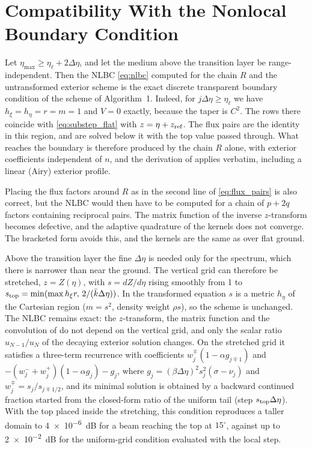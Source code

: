 \documentclass[journal]{IEEEtran}
\newcommand{\het}{\nu}
\newcommand{\etal}{\eta_{\ell}}
\begin{document}
\section{Compatibility With the Nonlocal Boundary Condition}\label{sec:nlbc}

Let $\eta_{\max}\ge\etal+2\Delta\eta$, and let the medium above the transition
layer be range-independent. Then the NLBC \eqref{eq:nlbc} computed for the
chain $R$ and the untransformed exterior scheme is the exact discrete
transparent boundary condition of the scheme of Algorithm~1. Indeed,
for $j\Delta\eta\ge\etal$ we have $h_\xi=h_\eta=r=m=1$ and $V=0$
exactly, because the taper is $C^2$. The rows there coincide with
\eqref{eq:substep_flat} with $z=\eta+z_{\rm ref}$. The flux pairs are the
identity in this region, and are solved below it with the top value passed
through. What reaches the boundary is therefore produced by the chain $R$
alone, with exterior coefficients independent of $n$, and the derivation of
\cite{lytaev2018awpl} applies verbatim, including a linear (Airy) exterior
profile.

Placing the flux factors around $R$ as in the second line of
\eqref{eq:flux_pairs} is also correct, but the NLBC would then have to be
computed for a chain of $p+2q$ factors containing reciprocal pairs. The matrix
function of the inverse $z$-transform becomes defective, and the adaptive
quadrature of the kernels does not converge. The bracketed form avoids this,
and the kernels are the same as over flat ground.

Above the transition layer the fine $\Delta\eta$ is needed only for the
spectrum, which there is narrower than near the ground. The vertical grid can
therefore be stretched, $z=Z(\eta)$, with $s=dZ/d\eta$ rising smoothly from 1
to $s_{\rm top}=\min(\max h_\xi r,\,2/(\bar k\Delta\eta))$. In the
transformed equation $s$ is a metric $h_\eta$ of the Cartesian region
($m=s^2$, density weight $\rho s$), so the scheme is unchanged. The NLBC
remains exact: the $z$-transform, the matrix function and the convolution of
\cite{lytaev2018awpl} do not depend on the vertical grid, and only the scalar
ratio $u_{N-1}/u_N$ of the decaying exterior solution changes. On the stretched
grid it satisfies a three-term recurrence with coefficients
$w^\mp_j(1-\alpha g_{j\mp1})$ and $-(w^-_j+w^+_j)(1-\alpha g_j)-g_j$, where
$g_j=(\beta\Delta\eta)^2s_j^2(\sigma-\het_j)$ and
$w^\mp_j=s_j/s_{j\mp1/2}$, and its minimal solution is obtained by a backward
continued fraction started from the closed-form ratio of the uniform tail
(step $s_{\rm top}\Delta\eta$). With the top placed inside the stretching,
this condition reproduces a taller domain to \SI{4e-6}{dB} for a beam reaching
the top at $15^\circ$, against up to \SI{2e-2}{dB} for the uniform-grid
condition evaluated with the local step.
\end{document}
